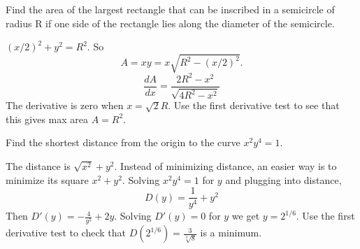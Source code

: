 \documentclass[../calc1-main.tex]{subfiles}
\begin{document}
\begin{example}
  Find the area of the largest rectangle that can be inscribed in a semicircle of radius R if one side of the rectangle lies along the diameter of the semicircle.

\end{example}

\begin{minipage}{0.5\textwidth}
  \begin{solution}
    $(x/2)^2 + y^2 = R^2$. So
    \[
      A = x y = x \sqrt{R^2 - (x/2)^2}.
    \]
    \[
      \frac{dA}{dx} = \frac{2R^2 - x^2}{\sqrt{4R^2-x^2}}
    \]
    The derivative is zero when $x=\sqrt{2}R$. Use the first derivative test to see that this gives max area $A = R^2$.
  \end{solution}
\end{minipage}%
\begin{minipage}{0.5\textwidth}
  \centering
\end{minipage}

\begin{example}
  Find the shortest distance from the origin to the curve $x^2 y^4 = 1$.
\end{example}
\begin{solution}
  The distance is $\sqrt{x^2} + y^2$. Instead of minimizing distance, an easier way is to minimize its square $x^2 + y^2$. Solving $x^2 y^4 = 1$ for $y$ and plugging into distance,
  \[
    D(y) = \frac{1}{y^4} + y^2
  \]
  Then $D'(y) = -\frac{4}{y^5} + 2y$. Solving $D'(y) = 0$ for $y$ we get $y = 2^{1/6}$. Use the first derivative test to check that $D(2^{1/6}) = \frac{3}{\sqrt[3]{8}}$ is a minimum.
\end{solution}
\end{document}
